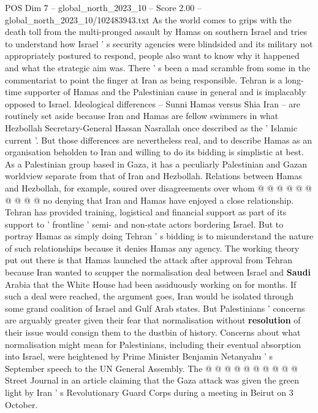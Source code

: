 \begin{textsample}{POS Dim 7 – global\_north\_2023\_10 – Score 2.00 – global\_north\_2023\_10/102483943.txt}  \label{ex:f7_pos_425}
As the world comes to grips with the death toll from the multi-pronged assault by Hamas on southern Israel and tries to understand how Israel ' s security agencies were blindsided and its military not appropriately postured to respond, people also want to know why it happened and what the strategic aim was.
There ' s been a mad scramble from some in the commentariat to point the finger at Iran as being responsible.
Tehran is a long-time supporter of Hamas and the Palestinian cause in general and is implacably opposed to Israel.
Ideological differences -- Sunni Hamas versus Shia Iran -- are routinely set aside because Iran and Hamas are fellow swimmers in what Hezbollah Secretary-General Hassan Nasrallah once described as the ' Islamic current '.
But those differences are nevertheless real, and to describe Hamas as an organisation beholden to Iran and willing to do its bidding is simplistic at best.
As a Palestinian group based in Gaza, it has a peculiarly Palestinian and Gazan worldview separate from that of Iran and Hezbollah.
Relations between Hamas and Hezbollah, for example, soured over disagreements over whom @ @ @ @ @ @ @ @ @ @ no denying that Iran and Hamas have enjoyed a close relationship.
Tehran has provided training, logistical and financial support as part of its support to ' frontline ' semi- and non-state actors bordering Israel.
But to portray Hamas as simply doing Tehran ' s bidding is to misunderstand the nature of such relationships because it denies Hamas any agency.
The working theory put out there is that Hamas launched the attack after approval from Tehran because Iran wanted to scupper the normalisation deal between Israel and \textbf{Saudi} Arabia that the White House had been assiduously working on for months.
If such a deal were reached, the argument goes, Iran would be isolated through some grand coalition of Israel and Gulf Arab states.
But Palestinians ' concerns are arguably greater given their fear that normalisation without \textbf{resolution} of their issue would consign them to the dustbin of history.
Concerns about what normalisation might mean for Palestinians, including their eventual absorption into Israel, were heightened by Prime Minister Benjamin Netanyahu ' s September speech to the UN General Assembly.
The @ @ @ @ @ @ @ @ @ @ Street Journal in an article claiming that the Gaza attack was given the green light by Iran ' s Revolutionary Guard Corps during a meeting in Beirut on 3 October.

\end{textsample}
